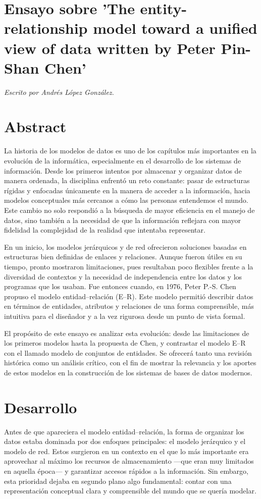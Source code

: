 \documentclass{article}
\begin{document}
\section*{Ensayo sobre 'The entity-relationship model toward a unified view of data written by Peter Pin-Shan Chen'}
\textit{Escrito por Andrés López González.}
\section*{Abstract}
La historia de los modelos de datos es uno de los capítulos más importantes en la evolución de la informática, especialmente en el desarrollo de los sistemas de información. Desde los primeros intentos por almacenar y organizar datos de manera ordenada, la disciplina enfrentó un reto constante: pasar de estructuras rígidas y enfocadas únicamente en la manera de acceder a la información, hacia modelos conceptuales más cercanos a cómo las personas entendemos el mundo. Este cambio no solo respondió a la búsqueda de mayor eficiencia en el manejo de datos, sino también a la necesidad de que la información reflejara con mayor fidelidad la complejidad de la realidad que intentaba representar.

En un inicio, los modelos jerárquicos y de red ofrecieron soluciones basadas en estructuras bien definidas de enlaces y relaciones. Aunque fueron útiles en su tiempo, pronto mostraron limitaciones, pues resultaban poco flexibles frente a la diversidad de contextos y la necesidad de independencia entre los datos y los programas que los usaban. Fue entonces cuando, en 1976, Peter P.-S. Chen propuso el modelo entidad–relación (E–R). Este modelo permitió describir datos en términos de entidades, atributos y relaciones de una forma comprensible, más intuitiva para el diseñador y a la vez rigurosa desde un punto de vista formal.

El propósito de este ensayo es analizar esta evolución: desde las limitaciones de los primeros modelos hasta la propuesta de Chen, y contrastar el modelo E–R con el llamado modelo de conjuntos de entidades. Se ofrecerá tanto una revisión histórica como un análisis crítico, con el fin de mostrar la relevancia y los aportes de estos modelos en la construcción de los sistemas de bases de datos modernos.

\section*{Desarrollo}
Antes de que apareciera el modelo entidad–relación, la forma de organizar los datos estaba dominada por dos enfoques principales: el modelo jerárquico y el modelo de red. Estos surgieron en un contexto en el que lo más importante era aprovechar al máximo los recursos de almacenamiento —que eran muy limitados en aquella época— y garantizar accesos rápidos a la información. Sin embargo, esta prioridad dejaba en segundo plano algo fundamental: contar con una representación conceptual clara y comprensible del mundo que se quería modelar.
\end{document}
